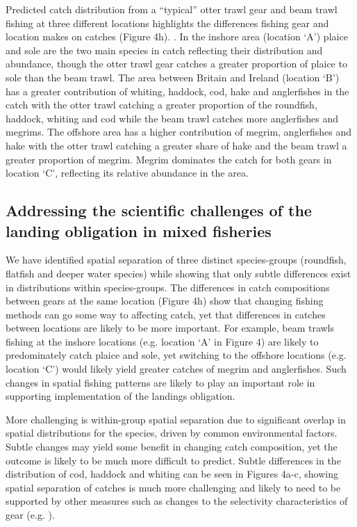 \documentclass{nature}
\begin{document}
\begin{linenumbers}
Predicted catch distribution from a ``typical'' otter trawl gear and beam trawl
fishing at three different locations highlights the differences fishing gear
and location makes on catches (Figure 4h). . In the inshore area (location `A') plaice and sole are
the two main species in catch reflecting their distribution and abundance,
though the otter trawl gear catches a greater proportion of plaice to sole than
the beam trawl.  The area between Britain and Ireland (location `B') has a
greater contribution of whiting, haddock, cod, hake and anglerfishes in the
catch with the otter trawl catching a greater proportion of the roundfish,
haddock, whiting and cod while the beam trawl catches more anglerfishes and
megrims. The offshore area has a higher contribution of megrim, anglerfishes
and hake with the otter trawl catching a greater share of hake and the beam
trawl a greater proportion of megrim. Megrim dominates the catch for both gears
in location `C', reflecting its relative abundance in the area.  

\subsection{Addressing the scientific challenges of the landing obligation in
	mixed fisheries}  We have
identified spatial separation of three distinct species-groups (roundfish,
flatfish and deeper water species) while showing that only subtle differences
exist in distributions within species-groups. The differences in catch
compositions between gears at the same location (Figure 4h) show that changing
fishing methods can go some way to affecting catch, yet that differences in
catches between locations are likely to be more important. For example, beam
trawls fishing at the inshore locations (e.g. location `A' in Figure 4) are
likely to predominately catch plaice and sole, yet switching to the offshore
locations (e.g. location `C') would likely yield greater catches of megrim and
anglerfishes.  Such changes in spatial fishing patterns are likely to play an
important role in supporting implementation of the landings obligation.

More challenging is within-group spatial separation due to significant overlap
in spatial distributions for the species, driven by common environmental
factors. Subtle changes may yield some benefit in changing catch composition,
yet the outcome is likely to be much more difficult to predict. 
Subtle differences in the distribution of cod, haddock and whiting can be seen
in Figures 4a-c, showing spatial separation of catches is much more challenging
and likely to need to be supported by other measures such as changes to the
selectivity characteristics of gear (e.g. \cite{Santos2016}). 


\end{linenumbers}
\end{document}

